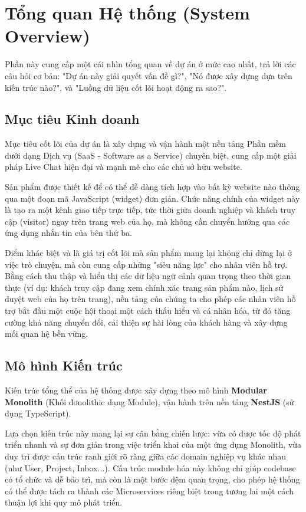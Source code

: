 \section{Tổng quan Hệ thống (System Overview)}
\label{sec:tong-quan}

Phần này cung cấp một cái nhìn tổng quan về dự án ở mức cao nhất, trả lời các câu hỏi cơ bản: "Dự án này giải quyết vấn đề gì?", "Nó được xây dựng dựa trên kiến trúc nào?", và "Luồng dữ liệu cốt lõi hoạt động ra sao?".

\subsection{Mục tiêu Kinh doanh}
\label{subsec:muc-tieu-kinh-doanh}

Mục tiêu cốt lõi của dự án là xây dựng và vận hành một nền tảng Phần mềm dưới dạng Dịch vụ (SaaS - Software as a Service) chuyên biệt, cung cấp một giải pháp Live Chat hiện đại và mạnh mẽ cho các chủ sở hữu website. 

Sản phẩm được thiết kế để có thể dễ dàng tích hợp vào bất kỳ website nào thông qua một đoạn mã JavaScript (widget) đơn giản. Chức năng chính của widget này là tạo ra một kênh giao tiếp trực tiếp, tức thời giữa doanh nghiệp và khách truy cập (visitor) ngay trên trang web của họ, mà không cần chuyển hướng qua các ứng dụng nhắn tin của bên thứ ba.

Điểm khác biệt và là giá trị cốt lõi mà sản phẩm mang lại không chỉ dừng lại ở việc trò chuyện, mà còn cung cấp những "siêu năng lực" cho nhân viên hỗ trợ. Bằng cách thu thập và hiển thị các dữ liệu ngữ cảnh quan trọng theo thời gian thực (ví dụ: khách truy cập đang xem chính xác trang sản phẩm nào, lịch sử duyệt web của họ trên trang), nền tảng của chúng ta cho phép các nhân viên hỗ trợ bắt đầu một cuộc hội thoại một cách thấu hiểu và cá nhân hóa, từ đó tăng cường khả năng chuyển đổi, cải thiện sự hài lòng của khách hàng và xây dựng mối quan hệ bền vững.
\subsection{Mô hình Kiến trúc}
\label{subsec:mo-hinh-kien-truc}

Kiến trúc tổng thể của hệ thống được xây dựng theo mô hình \textbf{Modular Monolith} (Khối đơnolithic dạng Module), vận hành trên nền tảng \textbf{NestJS} (sử dụng TypeScript).

Lựa chọn kiến trúc này mang lại sự cân bằng chiến lược: vừa có được tốc độ phát triển nhanh và sự đơn giản trong việc triển khai của một ứng dụng Monolith, vừa duy trì được cấu trúc ranh giới rõ ràng giữa các domain nghiệp vụ khác nhau (như User, Project, Inbox...). Cấu trúc module hóa này không chỉ giúp codebase có tổ chức và dễ bảo trì, mà còn là một bước đệm quan trọng, cho phép hệ thống có thể được tách ra thành các Microservices riêng biệt trong tương lai một cách thuận lợi khi quy mô phát triển.

